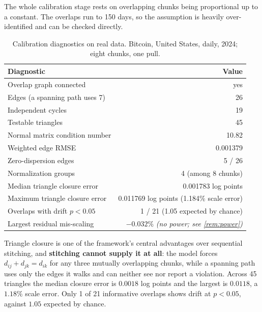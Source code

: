 \documentclass[12pt,a4paper,oneside]{article}
\begin{document}
The whole calibration stage rests on overlapping chunks being proportional up to
a constant. The overlaps run to 150 days, so the assumption is heavily
over-identified and can be checked directly.

\begin{table}[H]
\centering
\small
\caption{Calibration diagnostics on real data. Bitcoin, United States, daily,
2024; eight chunks, one pull.}
\label{tab:realdata}
\begin{tabular}{lr}
\toprule
Diagnostic & Value\\
\midrule
Overlap graph connected & yes\\
Edges (a spanning path uses 7) & 26\\
Independent cycles & 19\\
Testable triangles & 45\\
Normal matrix condition number & 10.82\\
Weighted edge RMSE & 0.001379\\
\midrule
Zero-dispersion edges & 5 / 26\\
Normalization groups & 4 (among 8 chunks)\\
\midrule
Median triangle closure error & 0.001783 log points\\
Maximum triangle closure error & 0.011769 log points (1.184\% scale error)\\
Overlaps with drift $p<0.05$ & 1 / 21 (1.05 expected by chance)\\
Largest residual mis-scaling & $-0.032\%$ \emph{(no power; see \cref{rem:power})}\\
\bottomrule
\end{tabular}
\end{table}

Triangle closure is one of the framework's central advantages over sequential
stitching, and \textbf{stitching cannot supply it at all}: the model forces
$d_{ij}+d_{jk}=d_{ik}$ for any three mutually overlapping chunks, while a
spanning path uses only the edges it walks and can neither see nor report a
violation. Across 45 triangles the median closure error is $0.0018$ log points
and the largest is $0.0118$, a $1.18\%$ scale error. Only 1 of 21 informative
overlaps shows drift at $p<0.05$, against $1.05$ expected by chance.
\end{document}
